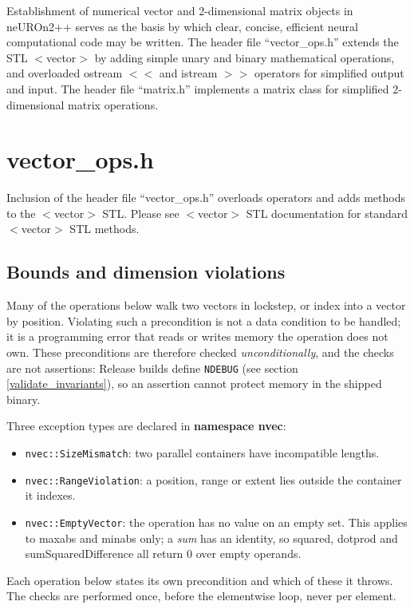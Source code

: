 \documentclass{report}
\begin{document}
Establishment of numerical vector and 2-dimensional matrix objects in
neUROn2++ serves as the basis by which clear, concise, efficient
neural computational code may be written.  The header file
``vector\_ops.h'' extends the STL $<$vector$>$ by adding simple unary
and binary mathematical operations, and overloaded ostream $<<$ and
istream $>>$ operators for simplified output and input.  The header
file ``matrix.h'' implements a matrix class for simplified
2-dimensional matrix operations.

\section{vector\_ops.h}

Inclusion of the header file ``vector\_ops.h'' overloads operators and
adds methods to the $<$vector$>$ STL.  Please see $<$vector$>$ STL
documentation for standard $<$vector$>$ STL methods.

\subsection{Bounds and dimension violations}\label{nvec_exceptions}

Many of the operations below walk two vectors in lockstep, or index
into a vector by position.  Violating such a precondition is not a
data condition to be handled; it is a programming error that reads or
writes memory the operation does not own.  These preconditions are
therefore checked {\em unconditionally}, and the checks are not
assertions: Release builds define \texttt{NDEBUG} (see section
\ref{validate_invariants}), so an assertion cannot protect memory in
the shipped binary.

Three exception types are declared in {\bf namespace nvec}:

\begin{itemize}
\item \texttt{nvec::SizeMismatch}: two parallel containers have
	incompatible lengths.
\item \texttt{nvec::RangeViolation}: a position, range or extent lies
	outside the container it indexes.
\item \texttt{nvec::EmptyVector}: the operation has no value on an
	empty set.  This applies to maxabs and minabs only; a {\em sum}
	has an identity, so squared, dotprod and sumSquaredDifference
	all return 0 over empty operands.
\end{itemize}

Each operation below states its own precondition and which of these it
throws.  The checks are performed once, before the elementwise loop,
never per element.
\end{document}
